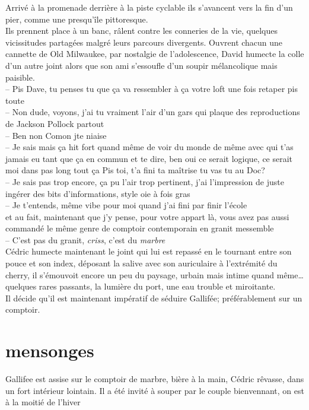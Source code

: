\documentclass{article}
\begin{document}
Arrivé à la promenade derrière à la piste cyclable ils s'avancent vers la
fin d'un pier, comme une presqu'île pittoresque. \\ Ils prennent place à un
banc, râlent contre les conneries de la vie, quelques vicissitudes partagées
malgré leurs parcours divergents. Ouvrent chacun une cannette de Old Milwaukee,
par nostalgie de l'adolescence, David humecte la colle d'un autre joint alors que
son ami s'essoufle d'un soupir mélancolique mais paisible.
\\ -- Pis Dave, tu
penses tu que ça va ressembler à ça votre loft une fois retaper pis toute\\
-- Non dude, voyons, j'ai tu vraiment l'air d'un gars qui plaque des
reproductions de
Jackson
Pollock partout \\
-- Ben non Comon jte niaise\\
-- Je sais mais ça hit fort quand même de voir du monde de même avec qui
t'as jamais eu tant que ça en commun et te dire, ben oui ce serait logique,
ce serait moi dans pas long tout ça \textelp{} Pis toi, t'a fini ta maîtrise tu
vas tu au Doc?\\
-- Je sais pas trop encore, ça pu l'air trop pertinent, j'ai l'impression
de juste ingérer des bits d'informations, style oie à fois gras\\
-- Je t'entends, même vibe pour moi quand j'ai fini par finir l'école\\

\textelp{} et au fait, maintenant que j'y pense, pour votre appart là, vous
avez pas aussi commandé le même genre de comptoir contemporain en granit
messemble\\
-- C'est pas du granit, \emph{criss}, c'est du \emph{marbre}\\

Cédric humecte maintenant le joint qui lui est repassé en le tournant entre son
pouce et son index, déposant la salive avec son auriculaire à l'extrémité du
cherry, il s'émouvoit encore un peu du paysage, urbain mais intime quand
même\ldots quelques rares passants, la lumière du port, une eau trouble et
miroitante.\\[1ex]
Il décide qu'il est maintenant impératif de séduire Gallifée; préférablement sur un comptoir.
\clearpage


\section{mensonges}

Gallifee est assise sur le comptoir de marbre, bière à la main, Cédric rêvasse,
dans un fort intérieur lointain. Il a été invité à souper par le couple
bienvennant, on est à la moitié de l'hiver\\
\end{document}
